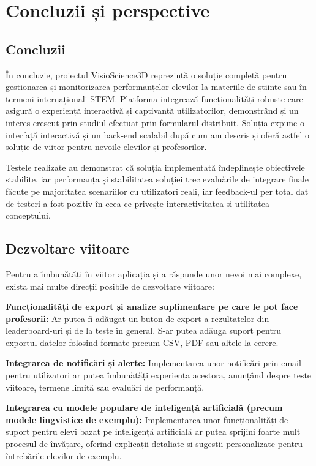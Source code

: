 \chapter{Concluzii și perspective}
\label{chapter:concluzii}

\section{Concluzii}
\label{sec:concluzii}

În concluzie, proiectul VisioScience3D reprezintă o soluție completă pentru gestionarea și monitorizarea performanțelor 
elevilor la materiile de științe sau în termeni internaționali STEM. Platforma integrează funcționalități robuste care
asigură o experiență interactivă și captivantă utilizatorilor, demonstrând și un interes crescut prin studiul efectuat
prin formularul distribuit. Soluția expune o interfață interactivă și un back-end
scalabil după cum am descris și oferă astfel o soluție de viitor pentru nevoile elevilor și profesorilor.

Testele realizate au demonstrat că soluția implementată îndeplinește obiectivele stabilite,
iar performanța și stabilitatea soluției trec evaluările de integrare finale făcute pe majoritatea scenariilor
cu utilizatori reali, iar feedback-ul per total dat de testeri a fost pozitiv în
ceea ce privește interactivitatea și utilitatea conceptului.

\section{Dezvoltare viitoare}
\label{sec:dezvoltare-viitoare}


Pentru a îmbunătăți în viitor aplicația și a răspunde unor nevoi mai complexe, există mai multe direcții
posibile de dezvoltare viitoare:

\textbf{Funcționalități de export și analize suplimentare pe care le pot face profesorii:}
Ar putea fi adăugat un buton de export a rezultatelor din leaderboard-uri și de la teste în general.
S-ar putea adăuga suport pentru exportul datelor folosind formate precum CSV, PDF sau altele la cerere.

\textbf{Integrarea de notificări și alerte:} 
Implementarea unor notificări prin email pentru utilizatori ar putea îmbunătăți
experiența acestora, anunțând despre teste viitoare, termene limită sau evaluări de performanță.

\textbf{Integrarea cu modele populare de inteligență artificială (precum modele lingvistice de exemplu):}
Implementarea unor funcționalități de suport pentru elevi bazat pe inteligență artificială
ar putea sprijini foarte mult procesul de învățare, oferind explicații detaliate și sugestii personalizate
pentru întrebările elevilor de exemplu.

